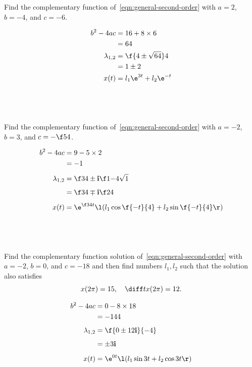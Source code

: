 \documentclass[a4paper]{article}
\begin{document}
\newpage
\subsection{~} %

\begin{questionbody}
Find the complementary function of~\eqref{eqn:general-second-order} with $a = 2$, $b = -4$, and $c = -6$.
\end{questionbody}
%
\begin{align*}
b^2 - 4ac &= 16 + 8 \times 6 \\
&= 64 \\
\lambda_{1,2} &= \f{4 \pm \sqrt{64}}4 \\
&= 1 \pm 2 \\
x(t) &= l_1 \e^{3t} + l_2 \e^{-t}
\end{align*}

\subsection{~} %

\begin{questionbody}
Find the complementary function of~\eqref{eqn:general-second-order} with $a = -2$, $b = 3$, and $c = -\f54$.
\end{questionbody}
%
\begin{align*}
b^2 - 4ac &= 9 - 5 \times 2 \\
&= -1 \\[1ex]
\lambda_{1,2} &= \f34 \pm \mathbf{i} \f1{-4} \sqrt{1} \\[1ex]
&= \f34 \mp \mathbf{i} \f24 \\[1ex]
x(t) &= \e^{\f34 t} \l( l_1 \cos \f{-t}{4} + l_2 \sin \f{-t}{4} \r)
\end{align*}

\subsection{~} %

\begin{questionbody}
Find the complementary function solution of~\eqref{eqn:general-second-order} with $a = -2$, $b = 0$, and $c = -18$ and then find numbers $l_1, l_2$ such that the solution also satisfies \[
x(2\pi) = 15, \quad \diff t x(2\pi) = 12.
\]
\end{questionbody}
%
\begin{align*}
b^2 - 4ac &= 0 - 8 \times 18 \\
&= -144 \\[1ex]
\lambda_{1,2} &= \f{0 \pm 12 \mathbf{i}}{-4} \\[1ex]
&= \pm 3 \mathbf{i} \\[1ex]
x(t) &= \e^{0t} \l( l_1 \sin 3t + l_2 \cos 3t \r)
\end{align*}
\end{document}
